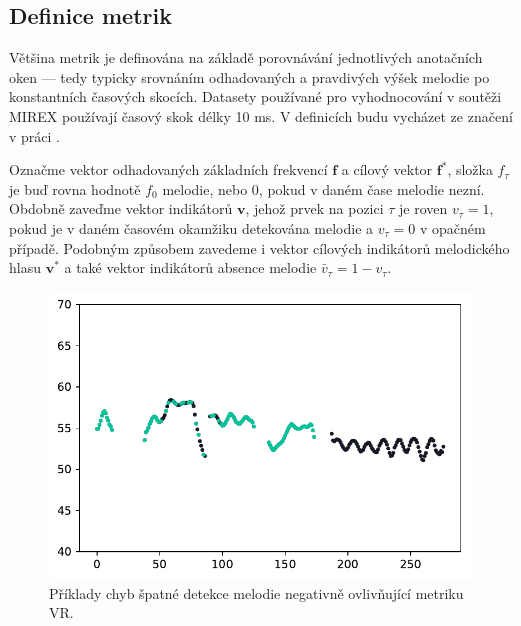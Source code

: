 


\subsection{Definice metrik}

Většina metrik je definována na základě porovnávání jednotlivých anotačních oken --- tedy typicky srovnáním odhadovaných a pravdivých výšek melodie po konstantních časových skocích. Datasety používané pro vyhodnocování v soutěži MIREX používají časový skok délky 10 ms. V definicích budu vycházet ze značení v práci \cite{Salamon2014}. 

    Označme vektor odhadovaných základních frekvencí $\mathbf{f}$ a cílový vektor $\mathbf{f^*}$, složka $f_\tau$ je buď rovna hodnotě $f_0$ melodie, nebo $0$, pokud v daném čase melodie nezní. Obdobně zaveďme vektor indikátorů $\mathbf{v}$, jehož prvek na pozici $\tau$ je roven $v_\tau=1$, pokud je v daném časovém okamžiku detekována melodie a $v_\tau = 0$ v opačném případě. Podobným způsobem zavedeme i vektor cílových indikátorů melodického hlasu $\mathbf{v^*}$ a také vektor indikátorů absence melodie $\bar{v}_\tau = 1 - v_\tau$. 

\begin{figure}[h!]\centering
\includegraphics[scale=0.5]{../img/chyba_VR}
\caption{Příklady chyb špatné detekce melodie negativně ovlivňující metriku VR.}
\label{obr:chyba_VR}
\end{figure}

